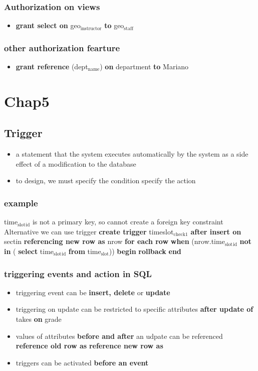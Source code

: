 \documentclass[11pt]{article}
\begin{document}
\subsubsection{Authorization on views}
\label{sec-8-5-5}
\begin{itemize}
\item \textbf{grant select on} geo$_{\text{instructor}}$ \textbf{to} geo$_{\text{staff}}$
\end{itemize}
\subsubsection{other authorization fearture}
\label{sec-8-5-6}
\begin{itemize}
\item \textbf{grant reference} (dept$_{\text{name}}$) \textbf{on} department \textbf{to} Mariano
\end{itemize}
\section{Chap5}
\label{sec-9}
\subsection{Trigger}
\label{sec-9-1}
\begin{itemize}
\item a statement that the system executes automatically by the system as a side
effect of a modification to the database
\item to design, we must
specify the condition
specify the action
\end{itemize}
\subsubsection{example}
\label{sec-9-1-1}
time$_{\text{slot}}$$_{\text{id}}$ is not a primary key, so cannot create a foreign key constraint
Alternative we can use trigger
\textbf{create trigger} timeslot$_{\text{check1}}$ \textbf{after insert on} sectin
\textbf{referencing new row as} nrow
\textbf{for each row}
\textbf{when} (nrow.time$_{\text{slot}}$$_{\text{id}}$ \textbf{not in} (
    \textbf{select} time$_{\text{slot}}$$_{\text{id}}$
    \textbf{from} time$_{\text{slot}}$))
\textbf{begin}
    \textbf{rollback}
\textbf{end}
\subsubsection{triggering events and action in SQL}
\label{sec-9-1-2}
\begin{itemize}
\item triggering event can be \textbf{insert, delete} or \textbf{update}
\item triggering on update can be restricted to specific attributes
\textbf{after update of} takes \textbf{on} grade
\item values of attributes \textbf{before and after} an udpate can be referenced
\textbf{reference old row as}
\textbf{reference new row as}
\item triggers can be activated \textbf{before an event}
\end{itemize}
\end{document}
